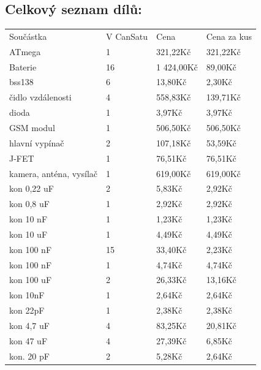 \documentclass[a4paper]{report}
\begin{document}
\subsection{Celkový seznam dílů:}
\begin{longtable}{L{6cm}L{3cm}L{3cm}L{3cm}}
Součástka               & V CanSatu & Cena       & Cena za kus \\
ATmega                  & 1         & 321,22Kč   & 321,22Kč    \\
Baterie                 & 16        & 1 424,00Kč & 89,00Kč     \\
bss138                  & 6         & 13,80Kč    & 2,30Kč      \\
čidlo vzdálenosti       & 4         & 558,83Kč   & 139,71Kč    \\
dioda                   & 1         & 3,97Kč     & 3,97Kč      \\
GSM modul               & 1         & 506,50Kč   & 506,50Kč    \\
hlavní vypínač          & 2         & 107,18Kč   & 53,59Kč     \\
J-FET                   & 1         & 76,51Kč    & 76,51Kč     \\
kamera, anténa, vysílač & 1         & 619,00Kč   & 619,00Kč    \\
kon 0,22 uF             & 2         & 5,83Kč     & 2,92Kč      \\
kon 0,8 uF              & 1         & 2,92Kč     & 2,92Kč      \\
kon 10 nF               & 1         & 1,23Kč     & 1,23Kč      \\
kon 10 uF               & 1         & 4,49Kč     & 4,49Kč      \\
kon 100 nF              & 15        & 33,40Kč    & 2,23Kč      \\
kon 100 nF              & 1         & 4,74Kč     & 4,74Kč      \\
kon 100 uF              & 2         & 26,33Kč    & 13,16Kč     \\
kon 10nF                & 1         & 2,64Kč     & 2,64Kč      \\
kon 22pF                & 1         & 2,38Kč     & 2,38Kč      \\
kon 4,7 uF              & 4         & 83,25Kč    & 20,81Kč     \\
kon 47 uF               & 4         & 27,39Kč    & 6,85Kč      \\
kon. 20 pF              & 2         & 5,28Kč     & 2,64Kč      \\

\end{longtable}
\end{document}
